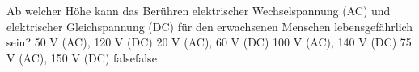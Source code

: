     {Ab welcher Höhe kann das Berühren elektrischer Wechselspannung (AC) und elektrischer Gleichspannung (DC) für den erwachsenen Menschen lebensgefährlich sein?}
    {50 V (AC), 120 V (DC)}
    {20 V (AC), 60 V (DC)}
    {100 V (AC), 140 V (DC)}
    {75 V (AC), 150 V (DC)}
    {false}{false}